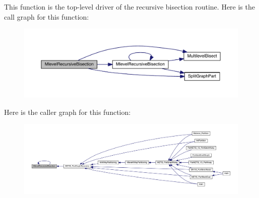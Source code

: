 This function is the top-\/level driver of the recursive bisection routine. Here is the call graph for this function\+:\nopagebreak
\begin{figure}[H]
\begin{center}
\leavevmode
\includegraphics[width=350pt]{a00945_a5510f276b321a8450b2e9cc913c2f00f_cgraph}
\end{center}
\end{figure}
Here is the caller graph for this function\+:\nopagebreak
\begin{figure}[H]
\begin{center}
\leavevmode
\includegraphics[width=350pt]{a00945_a5510f276b321a8450b2e9cc913c2f00f_icgraph}
\end{center}
\end{figure}
\mbox{\label{a00945_a83c822b078dbc1e2dd4d838d1068a780}} 
